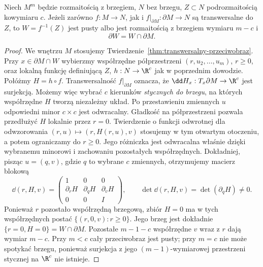 \begin{twierdzenie}
\label{thm:transwersalnosc-brzeg}
Niech $M^m$ będzie rozmaitością z brzegiem,
$N$ bez brzegu, $Z\subset N$ podrozmaitością
kowymiaru $c$. Jeżeli zarówno $f:M\to N$,
jak i $f|_{\partial M}:\partial M\to N$
są transwersalne do $Z$, to
$W=f^{-1}(Z)$ jest pusty albo jest rozmaitością z brzegiem
wymiaru $m-c$ i
\[
 \partial W=W\cap\partial M.
\]
\end{twierdzenie}
\begin{proof}
We wnętrzu $M$ stosujemy
Twierdzenie~\ref{thm:transwersalny-przeciwobraz}.
Przy $x\in\partial M\cap W$ wybierzmy współrzędne
półprzestrzeni $(r,u_2,\ldots,u_m)$,
$r\geq0$, oraz lokalną funkcję definiującą
$Z$, $h:N\to\R^c$ jak w poprzednim dowodzie.
Połóżmy $H=h\circ f$. Transwersalność
$f|_{\partial M}$ oznacza, że
$\dd H_x:T_x\partial M\to\R^c$ jest surjekcją.
Możemy więc wybrać $c$ kierunków
\emph{stycznych do brzegu}, na których
współrzędne $H$ tworzą niezależny układ.
Po przestawieniu zmiennych $u$ odpowiedni minor $c\times c$
jest odwracalny. Gładkość na półprzestrzeni pozwala
przedłużyć $H$ lokalnie przez $r=0$. Twierdzenie o funkcji
odwrotnej dla odwzorowania $(r,u)\mapsto(r,H(r,u),v)$ stosujemy
w tym otwartym otoczeniu, a potem ograniczamy do $r\geq0$.
Jego różniczka jest odwracalna właśnie dzięki wybranemu
minorowi i zachowaniu pozostałych współrzędnych.
Dokładniej, pisząc $u=(q,v)$, gdzie $q$ to wybrane
$c$ zmiennych, otrzymujemy macierz blokową
\[
 \dd(r,H,v)=
 \begin{pmatrix}
  1&0&0\\
  \partial_rH&\partial_qH&\partial_vH\\
  0&0&I
 \end{pmatrix},
 \qquad \det\dd(r,H,v)=\det(\partial_qH)\ne0.
\]
Ponieważ $r$ pozostało współrzędną brzegową,
zbiór $H=0$ ma w tych współrzędnych postać
$\{(r,0,v):r\geq0\}$. Jego brzeg jest dokładnie
$\{r=0,H=0\}=W\cap\partial M$.
Pozostałe $m-1-c$ współrzędne $v$ wraz z $r$
dają wymiar $m-c$. Przy $m<c$ cały przeciwobraz jest
pusty; przy $m=c$ nie może spotykać brzegu, ponieważ
surjekcja z jego $(m-1)$-wymiarowej przestrzeni stycznej
na $\R^c$ nie istnieje.
\end{proof}

